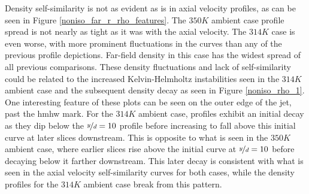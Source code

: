 Density self-similarity is not as evident as is in axial velocity profiles, as can be seen in Figure \ref{noniso_far_r_rho_features}. The $350 K$ ambient case profile spread is not nearly as tight as it was with the axial velocity. The $314 K$ case is even worse, with more prominent fluctuations in the curves than any of the previous profile depictions. Far-field density in this case has the widest spread of all previous comparisons. These density fluctuations and lack of self-similarity could be related to the increased Kelvin-Helmholtz instabilities seen in the $314 K$ ambient case and the subsequent density decay as seen in Figure \ref{noniso_rho_1}. One interesting feature of these plots can be seen on the outer edge of the jet, past the \gls{hmhw} mark. For the $314 K$ ambient case, profiles exhibit an initial decay as they dip below the $\nicefrac{y}{d}=10$ profile before increasing to fall above this initial curve at later slices downstream. This is opposite to what is seen in the $350 K$ ambient case, where earlier slices rise above the initial curve at $\nicefrac{y}{d} = 10$ before decaying below it farther downstream. This later decay is consistent with what is seen in the axial velocity self-similarity curves for both cases, while the density profiles for the $314 K$ ambient case break from this pattern. 

